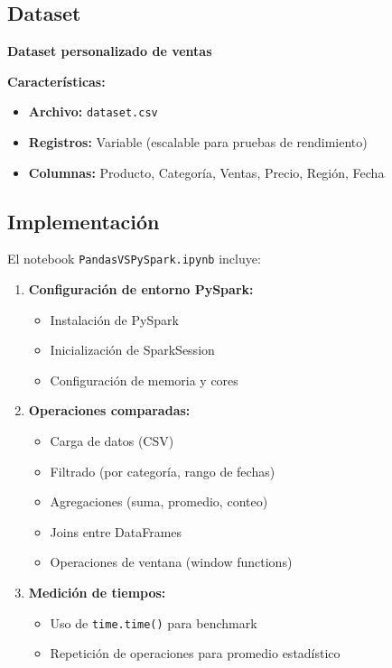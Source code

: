 \documentclass[12pt]{src/formato_utem}
\begin{document}
\subsection{Dataset}

\textbf{Dataset personalizado de ventas}

\textbf{Características:}
\begin{itemize}
    \item \textbf{Archivo:} \texttt{dataset.csv}
    \item \textbf{Registros:} Variable (escalable para pruebas de rendimiento)
    \item \textbf{Columnas:} Producto, Categoría, Ventas, Precio, Región, Fecha
\end{itemize}

\subsection{Implementación}

El notebook \texttt{PandasVSPySpark.ipynb} incluye:

\begin{enumerate}
    \item \textbf{Configuración de entorno PySpark:}
    \begin{itemize}
        \item Instalación de PySpark
        \item Inicialización de SparkSession
        \item Configuración de memoria y cores
    \end{itemize}
    
    \item \textbf{Operaciones comparadas:}
    \begin{itemize}
        \item Carga de datos (CSV)
        \item Filtrado (por categoría, rango de fechas)
        \item Agregaciones (suma, promedio, conteo)
        \item Joins entre DataFrames
        \item Operaciones de ventana (window functions)
    \end{itemize}
    
    \item \textbf{Medición de tiempos:}
    \begin{itemize}
        \item Uso de \texttt{time.time()} para benchmark
        \item Repetición de operaciones para promedio estadístico
    \end{itemize}
\end{enumerate}
\end{document}
